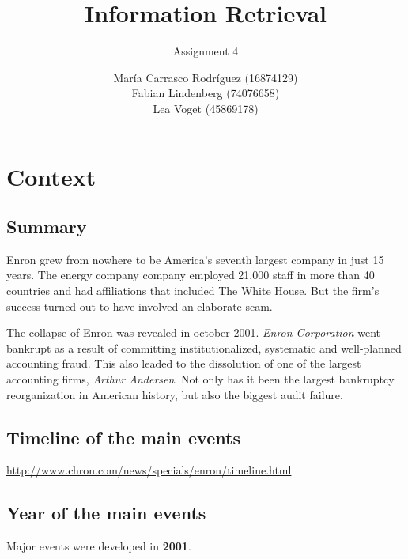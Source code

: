 \documentclass[a4paper,11pt,oneside]{book}
\title{Information Retrieval }
\subtitle{Assignment 4}
\author{ María Carrasco Rodríguez (16874129) \\
		Fabian Lindenberg (74076658)\\
		Lea Voget (45869178)}
\begin{document}
\kostspieligmaketitle


\chapter{Context}
\section{Summary}
Enron grew from nowhere to be America's seventh largest company in just 15 years. The energy company company employed 21,000 staff in more than 40 countries and had affiliations that included The White House. But the firm's success turned out to have involved an elaborate scam. 

The collapse of Enron was revealed in october 2001. {\it Enron Corporation} went bankrupt as a result of committing institutionalized, systematic and well-planned accounting fraud. This also leaded to the dissolution of one of the largest accounting firms, {\it Arthur Andersen}. Not only has it been the largest bankruptcy reorganization in American history, but also the biggest audit failure.


\section{Timeline of the main events}
\url{http://www.chron.com/news/specials/enron/timeline.html}

\section{Year of the main events}
Major events were developed in {\bf2001}.
\end{document}
